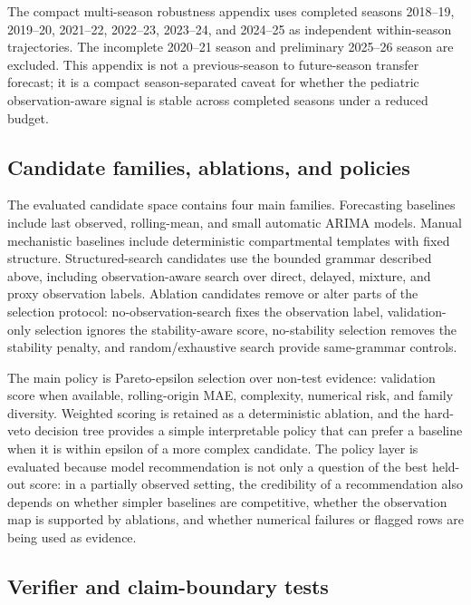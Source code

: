 The compact multi-season robustness appendix uses completed seasons
2018--19, 2019--20, 2021--22, 2022--23, 2023--24, and 2024--25 as independent
within-season trajectories. The incomplete 2020--21 season and preliminary
2025--26 season are excluded. This appendix is not a previous-season to
future-season transfer forecast; it is a compact season-separated caveat for
whether the pediatric observation-aware signal is stable across completed
seasons under a reduced budget.

\subsection{Candidate families, ablations, and policies}

The evaluated candidate space contains four main families. Forecasting
baselines include last observed, rolling-mean, and small automatic ARIMA
models. Manual mechanistic baselines include deterministic compartmental
templates with fixed structure. Structured-search candidates use the bounded
grammar described above, including observation-aware search over direct,
delayed, mixture, and proxy observation labels. Ablation candidates remove or
alter parts of the selection protocol: no-observation-search fixes the
observation label, validation-only selection ignores the stability-aware
score, no-stability selection removes the stability penalty, and
random/exhaustive search provide same-grammar controls.

The main policy is Pareto-epsilon selection over non-test evidence:
validation score when available, rolling-origin MAE, complexity, numerical
risk, and family diversity. Weighted scoring is retained as a deterministic
ablation, and the hard-veto decision tree provides a simple interpretable
policy that can prefer a baseline when it is within epsilon of a more complex
candidate. The policy layer is evaluated because model recommendation is not
only a question of the best held-out score: in a partially observed setting,
the credibility of a recommendation also depends on whether simpler baselines
are competitive, whether the observation map is supported by ablations, and
whether numerical failures or flagged rows are being used as evidence.

\subsection{Verifier and claim-boundary tests}

